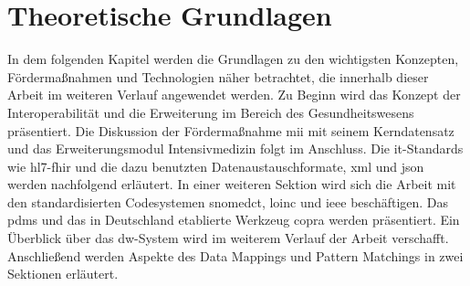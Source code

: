 \chapter{Theoretische Grundlagen} \label{ch:theobasis}

In dem folgenden Kapitel werden die Grundlagen zu den wichtigsten Konzepten, Fördermaßnahmen und Technologien näher betrachtet, die innerhalb dieser Arbeit im weiteren Verlauf angewendet werden. Zu Beginn wird das Konzept der Interoperabilität und die Erweiterung im Bereich des Gesundheitswesens präsentiert. Die Diskussion der Fördermaßnahme \glqq \ac{mii}\grqq{} mit seinem Kerndatensatz und das Erweiterungsmodul Intensivmedizin folgt im Anschluss. Die \ac{it}-Standards wie \ac{hl7}-\ac{fhir} und die dazu benutzten Datenaustauschformate, \ac{xml} und \ac{json} werden nachfolgend erläutert. In einer weiteren Sektion wird sich die Arbeit mit den standardisierten Codesystemen \ac{snomedct}, \ac{loinc} und \ac{ieee} beschäftigen. Das \ac{pdms} und das in Deutschland etablierte Werkzeug \ac{copra} werden präsentiert. Ein Überblick über das \ac{dw}-System wird im weiterem Verlauf der Arbeit verschafft. Anschließend werden Aspekte des Data Mappings und Pattern Matchings in zwei Sektionen erläutert.
